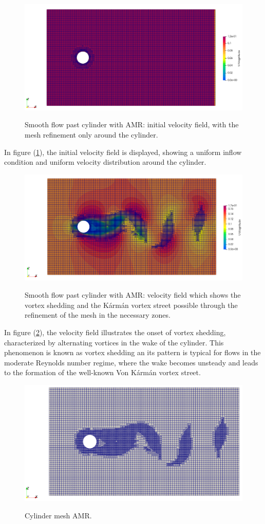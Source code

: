 \documentclass[a5paper]{sapthesis}
\begin{document}
	\begin{figure}[h]
		\centering
		{\includegraphics[width=0.58\linewidth]{Figures/Cylinder_u1}} 
		\caption[Smooth flow past cylinder with AMR: initial velocity field.]{Smooth flow past cylinder with AMR: initial velocity field, with the mesh refinement only around the cylinder.}
		\label{Cylinder_u1}
	\end{figure}
	
	\noindent In figure (\ref{Cylinder_u1}), the initial velocity field is displayed, showing a uniform inflow condition and uniform velocity distribution around the cylinder. 

	\begin{figure}[h]
		\centering
		{\includegraphics[width=0.58\linewidth]{Figures/Cylinder_u2}}  
		\caption[Smooth flow past cylinder with AMR: vortex shedding.]{Smooth flow past cylinder with AMR: velocity field which shows the vortex shedding and the Kármán vortex street possible through the refinement of the mesh in the necessary zones.}
		\label{Cylinder_u2}
	\end{figure}
	
	\noindent In figure (\ref{Cylinder_u2}), the velocity field illustrates the onset of vortex shedding, characterized by alternating vortices in the wake of the cylinder. This phenomenon is known as vortex shedding an its pattern is typical for flows in the moderate Reynolds number regime, where the wake becomes unsteady and leads to the formation of the well-known Von Kármán vortex street.
	
	\begin{figure}[h]
		\centering
		{\includegraphics[width=0.51\linewidth]{Figures/Cylinder_mesh_AMR}}
		\caption{Cylinder mesh AMR.}
		\label{Cylinder_mesh_AMR}
	\end{figure}
	
\end{document}
